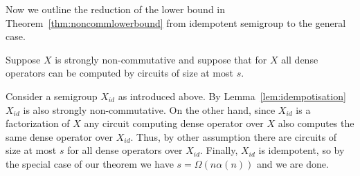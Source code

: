 \documentclass[11pt,letterpaper]{article}
\begin{document}
Now we outline the reduction of the lower bound in Theorem~\ref{thm:noncommlowerbound} from idempotent semigroup to the general case.

Suppose $X$ is strongly non-commutative and suppose that for $X$ all dense operators can be computed by circuits of size at most $s$.

Consider a semigroup $X_{id}$ as introduced above. By Lemma~\ref{lem:idempotisation} $X_{id}$ is also strongly non-commutative. On the other hand, since $X_{id}$ is a factorization of $X$ any circuit computing dense operator over $X$ also computes the same dense operator over $X_{id}$. Thus, by other assumption there are circuits of size at most $s$ for all dense operators over $X_{id}$. Finally, $X_{id}$ is idempotent, so by the special case of our theorem we have $s = \Omega(n \alpha(n))$ and we are done.
\end{document}
